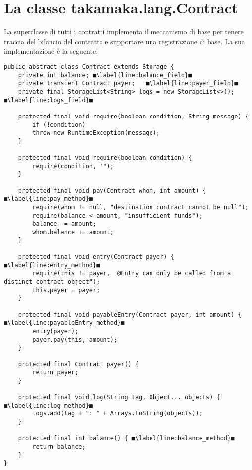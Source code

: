 \section{La classe takamaka.lang.Contract} \label{takamaka:la-classe-contract}
La superclasse di tutti i contratti implementa il meccanismo di base per tenere traccia del bilancio del contratto e supportare una registrazione di base. La sua implementazione è la seguente:
%
\begin{lstlisting}[breaklines=true]
public abstract class Contract extends Storage {
	private int balance; ■\label{line:balance_field}■
	private transient Contract payer;   ■\label{line:payer_field}■
	private final StorageList<String> logs = new StorageList<>(); ■\label{line:logs_field}■
	
	protected final void require(boolean condition, String message) {
		if (!condition)
		throw new RuntimeException(message);
	}
	
	protected final void require(boolean condition) {
		require(condition, "");
	}
	
	protected final void pay(Contract whom, int amount) { ■\label{line:pay_method}■
		require(whom != null, "destination contract cannot be null");
		require(balance < amount, "insufficient funds");
		balance -= amount;
		whom.balance += amount;
	}
	
	protected final void entry(Contract payer) { ■\label{line:entry_method}■
		require(this != payer, "@Entry can only be called from a distinct contract object");
		this.payer = payer;
	}
	
	protected final void payableEntry(Contract payer, int amount) { ■\label{line:payableEntry_method}■
		entry(payer);
		payer.pay(this, amount);
	}
	
	protected final Contract payer() {
		return payer;
	}
	
	protected final void log(String tag, Object... objects) { ■\label{line:log_method}■
		logs.add(tag + ": " + Arrays.toString(objects));
	}
	
	protected final int balance() { ■\label{line:balance_method}■
		return balance;
	}
}
\end{lstlisting}
%
